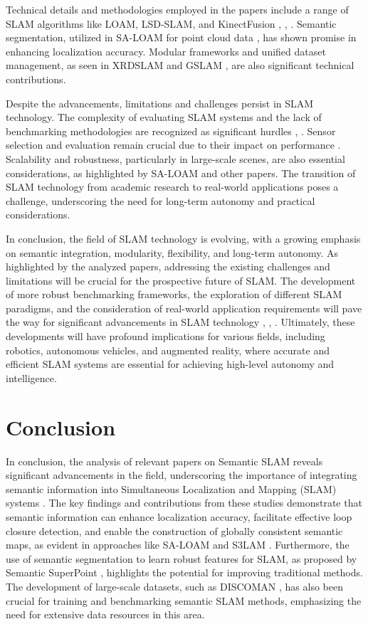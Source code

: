 \documentclass[conference]{IEEEtran}
\begin{document}
Technical details and methodologies employed in the papers include a range of SLAM algorithms like LOAM, LSD-SLAM, and KinectFusion \cite{b9}, \cite{b10}, \cite{b11}. Semantic segmentation, utilized in SA-LOAM for point cloud data \cite{b4}, has shown promise in enhancing localization accuracy. Modular frameworks and unified dataset management, as seen in XRDSLAM \cite{b6} and GSLAM \cite{b3}, are also significant technical contributions.

Despite the advancements, limitations and challenges persist in SLAM technology. The complexity of evaluating SLAM systems and the lack of benchmarking methodologies are recognized as significant hurdles \cite{b2}, \cite{b3}. Sensor selection and evaluation remain crucial due to their impact on performance \cite{b8}. Scalability and robustness, particularly in large-scale scenes, are also essential considerations, as highlighted by SA-LOAM \cite{b4} and other papers. The transition of SLAM technology from academic research to real-world applications poses a challenge, underscoring the need for long-term autonomy and practical considerations.

In conclusion, the field of SLAM technology is evolving, with a growing emphasis on semantic integration, modularity, flexibility, and long-term autonomy. As highlighted by the analyzed papers, addressing the existing challenges and limitations will be crucial for the prospective future of SLAM. The development of more robust benchmarking frameworks, the exploration of different SLAM paradigms, and the consideration of real-world application requirements will pave the way for significant advancements in SLAM technology \cite{b1}, \cite{b6}, \cite{b8}. Ultimately, these developments will have profound implications for various fields, including robotics, autonomous vehicles, and augmented reality, where accurate and efficient SLAM systems are essential for achieving high-level autonomy and intelligence.

\section{Conclusion}
In conclusion, the analysis of relevant papers on Semantic SLAM reveals significant advancements in the field, underscoring the importance of integrating semantic information into Simultaneous Localization and Mapping (SLAM) systems \cite{b1}. The key findings and contributions from these studies demonstrate that semantic information can enhance localization accuracy, facilitate effective loop closure detection, and enable the construction of globally consistent semantic maps, as evident in approaches like SA-LOAM \cite{b2} and S3LAM \cite{b3}. Furthermore, the use of semantic segmentation to learn robust features for SLAM, as proposed by Semantic SuperPoint \cite{b4}, highlights the potential for improving traditional methods. The development of large-scale datasets, such as DISCOMAN \cite{b5}, has also been crucial for training and benchmarking semantic SLAM methods, emphasizing the need for extensive data resources in this area.
\end{document}
